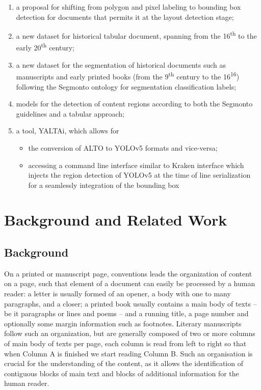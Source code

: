 \documentclass{jdmdh}
\begin{document}
\begin{enumerate}
    \item a proposal for shifting from polygon and pixel labeling to bounding box detection for documents that permits it at the layout detection stage;
    \item a new dataset for historical tabular document, spanning from the 16\textsuperscript{th} to the early 20\textsuperscript{th} century;
    \item a new dataset for the segmentation of historical documents such as manuscripts and early printed books (from the 9\textsuperscript{th} century to the 16\textsuperscript{16}) following the Segmonto ontology for segmentation classification labels;
    \item models for the detection of content regions according to both the Segmonto guidelines and a tabular approach;
    \item a tool, YALTAi, which allows for  \begin{itemize}
        \item the conversion of ALTO to YOLOv5 formats and vice-versa;
        \item accessing a command line interface similar to Kraken interface which injects the region detection of YOLOv5 at the time of line serialization for a seamlessly integration of the bounding box 
    \end{itemize}
\end{enumerate}

\section{Background and Related Work}
\label{sec:related}

\subsection{Background}

On a printed or manuscript page, conventions leads the organization of content on a page, such that element of a document can easily be processed by a human reader: a letter is usually formed of an opener, a body with one to many paragraphs, and a closer; a printed book usually contains a main body of texts -- be it paragraphs or lines and poems -- and a running title, a page number and optionally some margin information such as footnotes. Literary manuscripts follow such an organization, but are generally composed of two or more columns of main body of texts per page, each column is read from left to right so that when Column A is finished we start reading Column B. Such an organisation is crucial for the understanding of the content, as it allows the identification of contiguous blocks of main text and blocks of additional information for the human reader.
\end{document}
